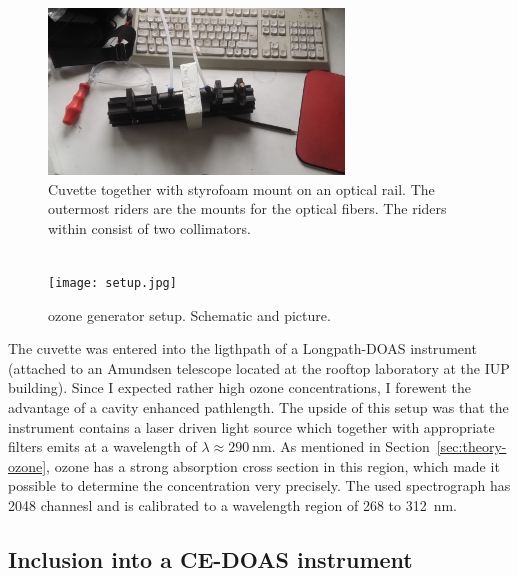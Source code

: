 \begin{figure}[htbp]
  \centering
  \includegraphics[width=0.7\textwidth]{images/cuvette.jpg}
  \caption{Cuvette together with styrofoam mount on an optical
    rail. The outermost riders are the mounts for the optical
    fibers. The riders within consist of two collimators.}
  \label{fig:cuvette}
\end{figure}

\begin{figure}[htbp]
  \centering
  {
  \def\svgwidth{0.9\linewidth}
  
  }
  \phantom{h}\\
  \vspace{2cm}
  \texttt{[image: setup.jpg]}
  \caption{ozone generator setup. Schematic and picture.}
  \label{fig:setup}
\end{figure}

The cuvette was entered into the ligthpath of a Longpath-DOAS
instrument (attached to an Amundsen telescope located at the rooftop
laboratory at the IUP building). Since I expected rather high ozone
concentrations, I forewent the advantage of a cavity enhanced
pathlength. The upside of this setup was that the instrument contains
a laser driven light source which together with appropriate filters
emits at a wavelength of $\lambda \approx \SI{290}{\nano\meter}$. As
mentioned in Section~\ref{sec:theory-ozone}, ozone has a strong
absorption cross section in this region, which made it possible to
determine the concentration very precisely. The used spectrograph has
2048 channesl and is calibrated to a wavelength region of \num{268} to
\SI{312}{\nano\meter}.

\subsection{Inclusion into a CE-DOAS instrument}
\label{sec:inclusion}

